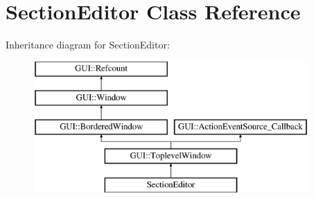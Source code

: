 \hypertarget{classSectionEditor}{\section{Section\-Editor Class Reference}
\label{classSectionEditor}
}
Inheritance diagram for Section\-Editor\-:\begin{figure}[H]
\begin{center}
\leavevmode
\includegraphics[height=5.000000cm]{classSectionEditor}
\end{center}
\end{figure}
